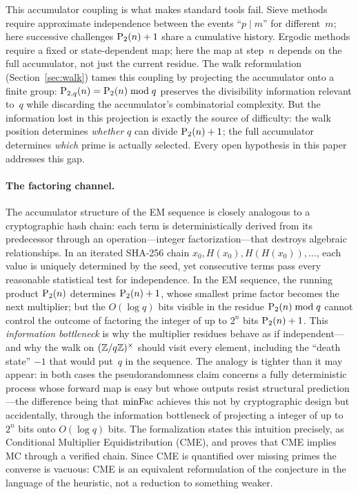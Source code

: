 This accumulator coupling is what makes standard tools fail.  Sieve
methods require approximate independence between the events
``$p \mid m$'' for different~$m$; here successive challenges
$\mathrm{P}_{2}(n)+1$ share a cumulative history.  Ergodic methods require a
fixed or state-dependent map; here the map at step~$n$ depends on the
full accumulator, not just the current residue.  The walk
reformulation (Section~\ref{sec:walk}) tames this coupling by
projecting the accumulator onto a finite group: $\mathrm{P}_{2,q}(n) =
\mathrm{P}_{2}(n) \bmod q$ preserves the divisibility information relevant
to~$q$ while discarding the accumulator's combinatorial complexity.
But the information lost in this projection is exactly the source of
difficulty: the walk position determines \emph{whether} $q$ can divide
$\mathrm{P}_{2}(n)+1$; the full accumulator determines \emph{which} prime is
actually selected.  Every open hypothesis in this paper addresses this gap.

\paragraph{The factoring channel.}
The accumulator structure of the EM sequence is closely analogous to a
cryptographic hash chain: each term is deterministically derived from
its predecessor through an operation---integer factorization---that
destroys algebraic relationships.  In an iterated SHA-256 chain
$x_0, H(x_0), H(H(x_0)), \ldots$, each value is uniquely determined
by the seed, yet consecutive terms pass every reasonable statistical
test for independence.  In the EM sequence, the running product
$\mathrm{P}_{2}(n)$ determines $\mathrm{P}_{2}(n)+1$, whose smallest prime factor
becomes the next multiplier; but the $O(\log q)$ bits visible in the
residue $\mathrm{P}_{2}(n) \bmod q$ cannot control the outcome of factoring the
integer of up to $2^n$ bits $\mathrm{P}_{2}(n)+1$.  This \emph{information
bottleneck} is why the multiplier residues behave as if
independent---and why the walk on $(\mathbb{Z}/q\mathbb{Z})^\times$ should visit
every element, including the ``death state'' $-1$ that would put~$q$
in the sequence.  The analogy is tighter than it may appear: in both
cases the pseudorandomness claim concerns a fully deterministic process
whose forward map is easy but whose outputs resist structural
prediction---the difference being that $\mathrm{minFac}$ achieves this not by
cryptographic design but accidentally, through the information
bottleneck of projecting a integer of up to $2^n$ bits onto $O(\log q)$
bits.  The formalization states this intuition precisely, as Conditional
Multiplier Equidistribution (CME), and proves that CME implies MC through a
verified chain.  Since CME is quantified over missing primes the converse is
vacuous: CME is an equivalent reformulation of the conjecture in the language
of the heuristic, not a reduction to something weaker.

